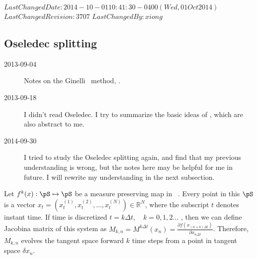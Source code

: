 \ifsvnmulti
 {$LastChangedDate: 2014-10-01 10:41:30 -0400 (Wed, 01 Oct 2014) $}
 {$LastChangedRevision: 3707 $} {$LastChangedBy: xiong $}
\fi

\subsection{Oseledec splitting}
\label{sect:CLVs}

\begin{description}
  
\item[2013-09-04 \XD] Notes on the Ginelli \etal\
  method, .

\item[2013-09-18 \XD]
  I didn't read Oseledec. I try to summarize the basic ideas
  of \refref{GiChLiPo12}, which are also abstract to me.

\item[2014-09-30 \XD]
  I tried to study the Oseledec splitting again, and find that my 
  previous understanding is wrong, but the notes here may be helpful
  for me in future. I will rewrite my understanding in the next 
  subsection.

\end{description}


 Let $f^{k}(x) : \pS \mapsto \pS$ be a measure preserving map in \statesp\ \pS. Every point
 in this $\pS$ is a vector $x_{t}=(x_{t}^{(1)},x_{t}^{(2)},\dots,x_{t}^{(N)})\in \mathbb{R}^N$,
 where the subscript $t$ denotes instant time. If time is discretized
 $t=k\Delta t,\quad k=0,1,2...$ , then we can define Jacobina
 matrix of this system as
 $M_{k,n}=M^{k\Delta t}(x_n)=\frac{\partial{f(x_{(n+k)\Delta t})}}{\partial{x_{n\Delta t}}}$.
 Therefore, $M_{k,n}$ evolves the tangent space forward $k$ time steps from a point in tangent
 space $\delta x_n$.



